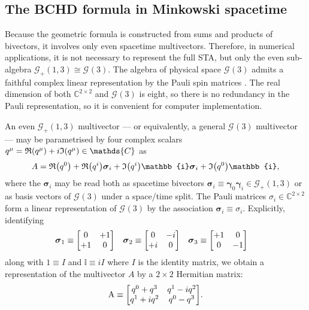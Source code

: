 \documentclass[12pt,a4paper]{article}
\makeatletter
\newcommand\x[1]{\@nameuse{\detokenize{#1}}}
\renewcommand{\vb}[1]{\boldsymbol{#1}}
\newcommand{\vg}[1]{\vb{\gamma}_{#1}}
\newcommand{\vs}[1]{\vb{\sigma}_{#1}}
\newcommand{\GA}[1][]{\mathcal{G}_{#1}}
\newcommand{\linmap}[1]{\mathrm{#1}}
\newcommand{\vol}{\mathbb{i}}
\newcommand{\CC}{\mathds{C}}
\newcommand{\RE}[1]{\mathfrak{R}\qty(#1)}
\newcommand{\IM}[1]{\mathfrak{I}\qty(#1)}
\makeatother
\begin{document}
\subsection{The BCHD formula in Minkowski spacetime}

Because the geometric \x{BCH} formula is constructed from sums and products of bivectors, it involves only even spacetime multivectors.
Therefore, in numerical applications, it is not necessary to represent the full STA, but only the even sub-algebra $\GA[+](1,3) \cong \GA(3)$.
The algebra of physical space $\GA(3)$ admits a faithful complex linear representation by the Pauli spin matrices \cite{baylis1989sta-pauli,lasenby2016ga-unified-language,hestenes2003sta}.
The real dimension of both $\CC^{2\times{}2}$ and $\GA(3)$ is eight, so there is no redundancy in the Pauli representation, so it is convenient for computer implementation.



An even $\GA[+](1,3)$ multivector --- or equivalently, a general $\GA(3)$ multivector --- may be parametrised by four complex scalars $q^\mu{} = \RE{q^\mu{}} + i\IM{q^\mu{}} \in \CC$ as
\begin{align}
	A = \RE{q^0} + \RE{q^i}\vs i + \IM{q^i}\vol\vs i + \IM{q^0}\vol
,\end{align}
where the $\vs i$ may be read both as spacetime bivectors $\vs i \equiv \vg 0\vg i \in \GA[+](1,3)$ or as basis vectors of $\GA(3)$ under a space/time split.
The Pauli matrices $\sigma{}_i \in{} \CC^{2\times{}2}$ form a linear representation of $\GA(3)$ by the association $\vs i \equiv \sigma{}_i$.
Explicitly, identifying
\begin{align}
	\vs1 &\equiv \mqty[
		 0&+1\\
		+1& 0\\
	]
&	\vs2 &\equiv \mqty[
		 0&-i\\
		+i& 0\\
	]
&	\vs3 &\equiv \mqty[
		+1& 0\\
		 0&-1\\
	]
\end{align}
along with $1 \equiv I$ and $\vol \equiv iI$ where $I$ is the identity matrix, we obtain a representation of the multivector $A$ by a $2 \times{} 2$ Hermitian matrix:
\begin{align}
	\linmap A \equiv \mqty[
		q^0 + q^3 & q^1 - iq^2 \\
		q^1 + iq^2 & q^0 - q^3
	]
	\label{eqn:multivector-as-matrix}
.\end{align}
\end{document}
